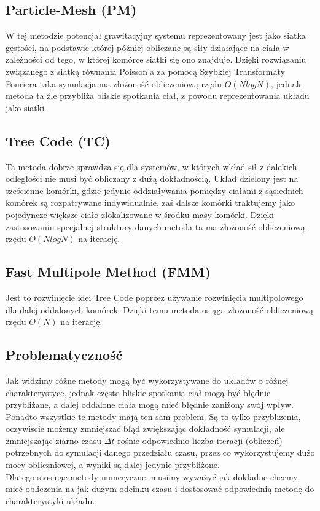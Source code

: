 \documentclass{article}
\begin{document}
\subsection*{Particle-Mesh (PM)}
W tej metodzie potencjał grawitacyjny systemu reprezentowany jest jako siatka gęstości, na podstawie której później obliczane są siły działające na ciała w zależności od tego, w której komórce siatki się ono znajduje. Dzięki rozwiązaniu związanego z siatką równania Poisson'a za pomocą Szybkiej Transformaty Fouriera taka symulacja ma złożoność obliczeniową rzędu $O(NlogN)$, jednak metoda ta źle przybliża bliskie spotkania ciał, z powodu reprezentowania układu jako siatki.

\subsection*{Tree Code (TC)}
Ta metoda dobrze sprawdza się dla systemów, w których wkład sił z dalekich odległości nie musi być obliczany z dużą dokładnością. Układ dzielony jest na sześcienne komórki, gdzie jedynie oddziaływania pomiędzy ciałami z sąsiednich komórek są rozpatrywane indywidualnie, zaś dalsze komórki traktujemy jako pojedyncze większe ciało zlokalizowane w środku masy komórki. Dzięki zastosowaniu specjalnej struktury danych metoda ta ma złożoność obliczeniową rzędu $O(NlogN)$ na iterację.


\subsection*{Fast Multipole Method (FMM)}
Jest to rozwinięcie idei Tree Code poprzez używanie rozwinięcia multipolowego dla dalej oddalonych komórek. Dzięki temu metoda osiąga złożoność obliczeniową rzędu $O(N)$ na iterację.

\subsection*{Problematyczność}
Jak widzimy różne metody mogą być wykorzystywane do układów o różnej charakterystyce, jednak często bliskie spotkania ciał mogą być błędnie przybliżane, a dalej oddalone ciała mogą mieć błędnie zaniżony swój wpływ. Ponadto wszystkie te metody mają ten sam problem. Są to tylko przybliżenia, oczywiście możemy zmniejszać błąd zwiększając dokładność symulacji, ale zmniejszając ziarno czasu $\Delta t$ rośnie odpowiednio liczba iteracji (obliczeń) potrzebnych do symulacji danego przedziału czasu, przez co wykorzystujemy dużo mocy obliczniowej, a wyniki są dalej jedynie przybliżone.\\
Dlatego stosując metody numeryczne, musimy wyważyć jak dokładne chcemy mieć obliczenia na jak dużym odcinku czasu i dostosować odpowiednią metodę do charakterystyki układu.
\clearpage
\end{document}
